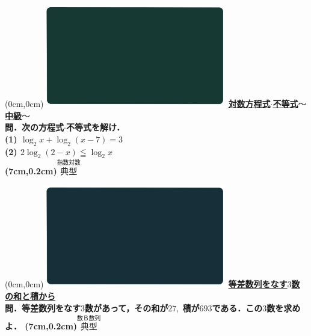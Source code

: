 \documentclass[10pt,
fleqn,
dvipdfmx,
uplatex
]{jsarticle}
\begin{document}
\newpage

\at(0cm,0cm){\includegraphics[width=8cm,bb=0 0 1920 1080]{./youtube/thumbnails/templates/smart_background/指数対数.jpeg}}
{\color{orange}\bf\boldmath\Large\underline{対数方程式$\cdot$不等式$〜$中級$〜$}}\vspace{0.3zw}\\
\Large 
\bf\boldmath 問．次の方程式$\cdot$不等式を解け．\\
(1)  $\log _2x+\log _2\left(x-7\right)=3$\\
(2)  $2\log _2\left(2-x\right)\leqq \log _2x$\\

\at(7cm,0.2cm){\small\color{bradorange}$\overset{\text{指数対数}}{\text{典型}}$}

\newpage

\at(0cm,0cm){\includegraphics[width=8cm,bb=0 0 1920 1080]{./youtube/thumbnails/templates/smart_background/数B数列.jpeg}}
{\color{orange}\bf\boldmath\large\underline{等差数列をなす$3$数の和と積から}}\vspace{0.3zw}\\
\Large 
\bf\boldmath 問．等差数列をなす$3$数があって，その和が${27},\;$積が${693}$である．この$3$数を求めよ．
\at(7cm,0.2cm){\small\color{bradorange}$\overset{\text{数Ｂ数列}}{\text{典型}}$}

\newpage
\end{document}
